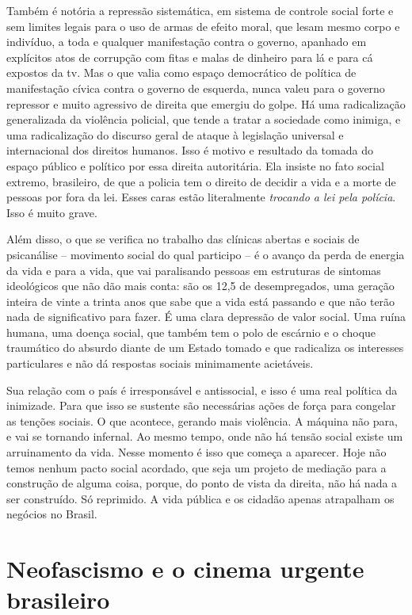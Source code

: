 Também é notória a repressão sistemática, em sistema de controle social
forte e sem limites legais para o uso de armas de efeito moral, que
lesam mesmo corpo e indivíduo, a toda e qualquer manifestação contra o
governo, apanhado em explícitos atos de corrupção com fitas e malas de
dinheiro para lá e para cá expostos da tv. Mas o que valia como espaço
democrático de política de manifestação cívica contra o governo de
esquerda, nunca valeu para o governo repressor e muito agressivo de
direita que emergiu do golpe. Há uma radicalização generalizada da
violência policial, que tende a tratar a sociedade como inimiga, e uma
radicalização do discurso geral de ataque à legislação universal e
internacional dos direitos humanos. Isso é motivo e resultado da tomada
do espaço público e político por essa direita autoritária. Ela insiste
no fato social extremo, brasileiro, de que a policia tem o direito de
decidir a vida e a morte de pessoas por fora da lei. Esses caras estão
literalmente \emph{trocando a lei pela polícia}. Isso é muito grave.

Além disso, o que se verifica no trabalho das clínicas abertas e sociais
de psicanálise -- movimento social do qual participo -- é o avanço da
perda de energia da vida e para a vida, que vai paralisando pessoas em
estruturas de sintomas ideológicos que não dão mais conta: são os 12,5
de desempregados, uma geração inteira de vinte a trinta anos que sabe
que a vida está passando e que não terão nada de significativo para
fazer. É uma clara depressão de valor social. Uma ruína humana, uma
doença social, que também tem o polo de escárnio e o choque traumático
do absurdo diante de um Estado tomado e que radicaliza os interesses
particulares e não dá respostas sociais minimamente acietáveis.

Sua relação com o país é irresponsável e antissocial, e isso é uma real
política da inimizade. Para que isso se sustente são necessárias ações
de força para congelar as tenções sociais. O que acontece, gerando mais
violência. A máquina não para, e vai se tornando infernal. Ao mesmo
tempo, onde não há tensão social existe um arruinamento da vida. Nesse
momento é isso que começa a aparecer. Hoje não temos nenhum pacto social
acordado, que seja um projeto de mediação para a construção de alguma
coisa, porque, do ponto de vista da direita, não há nada a ser
construído. Só reprimido. A vida pública e os cidadão apenas atrapalham
os negócios no Brasil.

\chapter{Neofascismo e o cinema urgente brasileiro }

